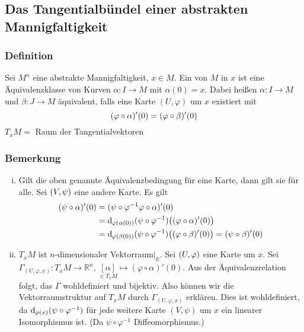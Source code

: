 \subsection{Das Tangentialbündel einer abstrakten Mannigfaltigkeit}
\label{sub:15}

\subsubsection{Definition}
\label{ssub:128}
Sei $M^n$ eine abstrakte Mannigfaltigkeit, $x\in M$. Ein  von $M$ in $x$ ist eine Äquivalenzklasse von Kurven $\alpha : I\to M$ mit $\alpha(0) = x$. Dabei heißen $\alpha:I\to M$ und $\beta:J\to M$ äquivalent, falls eine Karte $(U,\varphi)$ um $x$ existiert mit
\[
\enbrace{\varphi \circ \alpha}'(0) = \enbrace{\varphi \circ \beta}'(0)
\]
$T_x M =$ Raum der Tangentialvektoren

\subsubsection{Bemerkung}
\label{ssub:129}
\begin{enumerate}[(i)]
\item Gilt die oben genannte Äquivalenzbedingung für eine Karte, dann gilt sie für alle.
Sei $\enbrace{V,\psi}$ eine andere Karte. Es gilt
\begin{align*}
\enbrace{\psi \circ \alpha}'(0) &= \enbrace{\psi \circ \varphi^{-1} \varphi \circ \alpha}'(0)\\
&= \mathd_{\varphi(\alpha(0))} (\psi \circ \varphi^{-1})\enbrace[\big]{(\varphi \circ \alpha)'(0)}\\
&= \mathd_{\varphi(\beta(0))} (\psi \circ \varphi^{-1})\enbrace[\big]{(\varphi \circ \beta)'(0)} = \enbrace{\psi \circ \beta}'(0)
\end{align*}
\item $T_x M$ ist $n$-dimensionaler Vektorraum$\vert_{\mathds{R}}$.
Sei $\enbrace{U,\varphi}$ eine Karte um $x$. Sei $\Gamma_{(U,\varphi,x)}: T_x M\to \mathds{R}^n$, $\underset{\in T_x M}{[\alpha]} \mapsto (\varphi \circ \alpha)' (0)$. Aus der Äquivalenzrelation folgt, das $\Gamma$ wohldefiniert und bijektiv. Also können wir die Vektorraumstruktur auf $T_x M$ durch $\Gamma_{(U,\varphi,x)}$ erklären. Dies ist wohldefiniert, da $\mathd_{\varphi(x)} (\psi \circ \varphi^{-1})$ für jede weitere Karte $(V,\psi)$ um $x$ ein linearer Isomorphismus ist. (Da $\psi \circ \varphi^{-1}$ Diffeomorphismus.) 
\end{enumerate}

